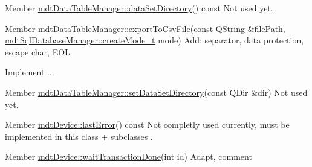 \label{todo__todo000081}
\hypertarget{todo__todo000081}{}
 
\begin{DoxyDescription}
\item[Member \hyperlink{classmdt_data_table_manager_a8fa0924a76e8f3fec9617f690cc4e148}{mdtDataTableManager::dataSetDirectory}() const  ]Not used yet. 
\end{DoxyDescription}

\label{todo__todo000082}
\hypertarget{todo__todo000082}{}
 
\begin{DoxyDescription}
\item[Member \hyperlink{classmdt_data_table_manager_abe733f071ca77579522823598e79dd9a}{mdtDataTableManager::exportToCsvFile}(const QString \&filePath, \hyperlink{classmdt_sql_database_manager_a2f5b46d67a88095053a5edfc415c7418}{mdtSqlDatabaseManager::createMode\_\-t} mode) ]Add: separator, data protection, escape char, EOL 

Implement ... 
\end{DoxyDescription}

\label{todo__todo000080}
\hypertarget{todo__todo000080}{}
 
\begin{DoxyDescription}
\item[Member \hyperlink{classmdt_data_table_manager_a1e19b3f34c1b0a91bcae4396731efc57}{mdtDataTableManager::setDataSetDirectory}(const QDir \&dir) ]Not used yet. 
\end{DoxyDescription}

\label{todo__todo000006}
\hypertarget{todo__todo000006}{}
 
\begin{DoxyDescription}
\item[Member \hyperlink{classmdt_device_a79ca328ff9e9f413a38c1cc9c9267cee}{mdtDevice::lastError}() const  ]Not completly used currently, must be implemented in this class + subclasses . 
\end{DoxyDescription}

\label{todo__todo000007}
\hypertarget{todo__todo000007}{}
 
\begin{DoxyDescription}
\item[Member \hyperlink{classmdt_device_ab937015c1a319b7234442a4cc29a02a8}{mdtDevice::waitTransactionDone}(int id) ]Adapt, comment
\end{DoxyDescription}

\label{todo__todo000033}
\hypertarget{todo__todo000033}{}
 
